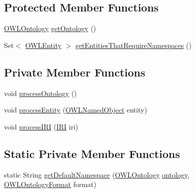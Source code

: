 \subsection*{Protected Member Functions}
\begin{DoxyCompactItemize}
\item 
\hyperlink{interfaceorg_1_1semanticweb_1_1owlapi_1_1model_1_1_o_w_l_ontology}{O\-W\-L\-Ontology} \hyperlink{classorg_1_1coode_1_1xml_1_1_o_w_l_ontology_x_m_l_namespace_manager_a61bc8c884b8f8dd439aeea607935928f}{get\-Ontology} ()
\item 
Set$<$ \hyperlink{interfaceorg_1_1semanticweb_1_1owlapi_1_1model_1_1_o_w_l_entity}{O\-W\-L\-Entity} $>$ \hyperlink{classorg_1_1coode_1_1xml_1_1_o_w_l_ontology_x_m_l_namespace_manager_a68f730b79c28f04aa9bfc3dc837a05eb}{get\-Entities\-That\-Require\-Namespaces} ()
\end{DoxyCompactItemize}
\subsection*{Private Member Functions}
\begin{DoxyCompactItemize}
\item 
void \hyperlink{classorg_1_1coode_1_1xml_1_1_o_w_l_ontology_x_m_l_namespace_manager_a5c67377373c1a6f4aa2d2119ab072972}{process\-Ontology} ()
\item 
void \hyperlink{classorg_1_1coode_1_1xml_1_1_o_w_l_ontology_x_m_l_namespace_manager_abb3d68187fadcaca938fd69f7ab8aaea}{process\-Entity} (\hyperlink{interfaceorg_1_1semanticweb_1_1owlapi_1_1model_1_1_o_w_l_named_object}{O\-W\-L\-Named\-Object} entity)
\item 
void \hyperlink{classorg_1_1coode_1_1xml_1_1_o_w_l_ontology_x_m_l_namespace_manager_a6af06ba539ea0d23705e329af5537b3c}{process\-I\-R\-I} (\hyperlink{classorg_1_1semanticweb_1_1owlapi_1_1model_1_1_i_r_i}{I\-R\-I} iri)
\end{DoxyCompactItemize}
\subsection*{Static Private Member Functions}
\begin{DoxyCompactItemize}
\item 
static String \hyperlink{classorg_1_1coode_1_1xml_1_1_o_w_l_ontology_x_m_l_namespace_manager_aecff363fd44307eb58f663f7c38b2d02}{get\-Default\-Namespace} (\hyperlink{interfaceorg_1_1semanticweb_1_1owlapi_1_1model_1_1_o_w_l_ontology}{O\-W\-L\-Ontology} \hyperlink{classorg_1_1coode_1_1xml_1_1_o_w_l_ontology_x_m_l_namespace_manager_aeb4906fd8488526e3e5dbff9393a0571}{ontology}, \hyperlink{classorg_1_1semanticweb_1_1owlapi_1_1model_1_1_o_w_l_ontology_format}{O\-W\-L\-Ontology\-Format} format)
\end{DoxyCompactItemize}
